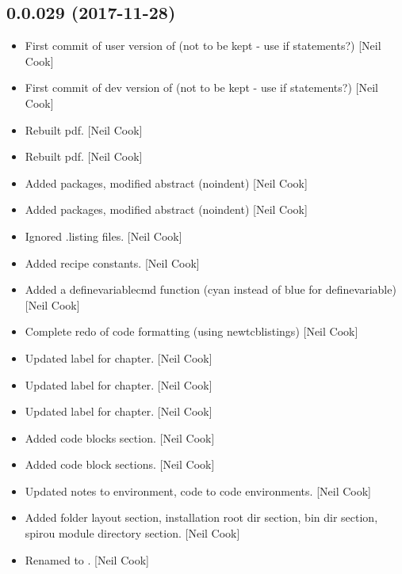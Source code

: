 \documentclass[a4paper,10pt,english]{report}
\begin{document}
\subsection{0.0.029 (2017-11-28)}
\label{\detokenize{misc/changelog:id523}}\begin{itemize}
\item {} 
First commit of user version of  (not to be kept -
use if statements?) {[}Neil Cook{]}

\item {} 
First commit of dev version of  (not to be kept - use
if statements?) {[}Neil Cook{]}

\item {} 
Rebuilt pdf. {[}Neil Cook{]}

\item {} 
Rebuilt pdf. {[}Neil Cook{]}

\item {} 
Added packages, modified abstract (noindent) {[}Neil Cook{]}

\item {} 
Added packages, modified abstract (noindent) {[}Neil Cook{]}

\item {} 
Ignored .listing files. {[}Neil Cook{]}

\item {} 
Added recipe constants. {[}Neil Cook{]}

\item {} 
Added a definevariablecmd function (cyan instead of blue for
definevariable) {[}Neil Cook{]}

\item {} 
Complete redo of code formatting (using newtcblistings) {[}Neil Cook{]}

\item {} 
Updated label for chapter. {[}Neil Cook{]}

\item {} 
Updated label for chapter. {[}Neil Cook{]}

\item {} 
Updated label for chapter. {[}Neil Cook{]}

\item {} 
Added code blocks section. {[}Neil Cook{]}

\item {} 
Added code block sections. {[}Neil Cook{]}

\item {} 
Updated notes to environment, code to code environments. {[}Neil Cook{]}

\item {} 
Added folder layout section, installation root dir section, bin dir
section, spirou module directory section. {[}Neil Cook{]}

\item {} 
Renamed  to . {[}Neil Cook{]}

\end{itemize}
\end{document}
